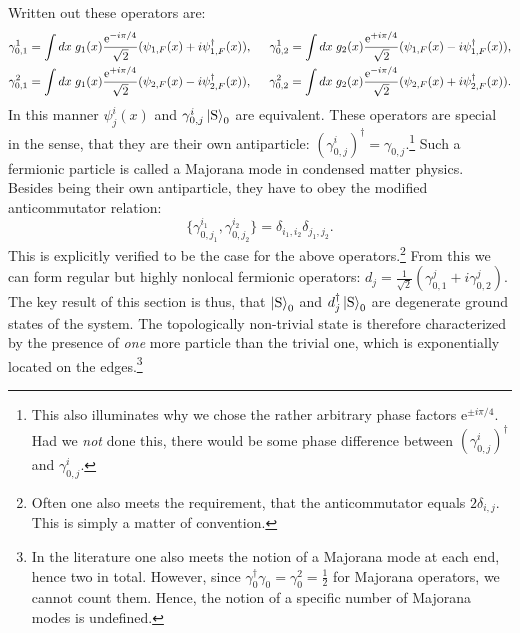 Written out these operators are: 
\begin{align}
\gamma^1_{0,1} &= \int dx \; g_1(x)\frac{\text{e}^{-i\pi/4}}{\sqrt{2}}(\psi_{1,F}(x) + i\psi^\dagger_{1,F}(x)), \hspace{0.5cm} \gamma^1_{0,2} = \int dx \; g_2(x)\frac{\text{e}^{+i\pi/4}}{\sqrt{2}}(\psi_{1,F}(x) - i\psi^\dagger_{1,F}(x)), \nonumber \\
\gamma^2_{0,1} &= \int dx \; g_1(x)\frac{\text{e}^{+i\pi/4}}{\sqrt{2}}(\psi_{2,F}(x) - i\psi^\dagger_{2,F}(x)), \hspace{0.5cm} \gamma^2_{0,2} = \int dx \; g_2(x)\frac{\text{e}^{-i\pi/4}}{\sqrt{2}}(\psi_{2,F}(x) + i \psi^\dagger_{2,F}(x)). \nonumber 
\end{align}
In this manner $\psi^{i}_{j}(x)$ and $\gamma^{i}_{0,j}\ket{\text{S}}_0$ are equivalent. These operators are special in the sense, that they are their own antiparticle: $\left(\gamma^{i}_{0,j}\right)^\dagger = \gamma_{0,j}$.\footnote{This also illuminates why we chose the rather arbitrary phase factors $\text{e}^{\pm i\pi/4}$. Had we \textit{not} done this, there would be some phase difference between $\left(\gamma^{i}_{0,j}\right)^\dagger$ and $\gamma^{i}_{0,j}$.} Such a fermionic particle is called a Majorana mode in condensed matter physics. Besides being their own antiparticle, they have to obey the modified anticommutator relation:
\begin{equation}
\{\gamma^{i_1}_{0,j_1}, \gamma^{i_2}_{0,j_2} \} = \delta_{i_1,i_2}\delta_{j_1,j_2}. \nonumber
\end{equation}
This is explicitly verified to be the case for the above operators.\footnote{Often one also meets the requirement, that the anticommutator equals $2\delta_{i,j}$. This is simply a matter of convention.} From this we can form regular but highly nonlocal fermionic operators: $d_j = \frac{1}{\sqrt{2}}(\gamma^{j}_{0,1} + i\gamma^{j}_{0,2})$. The key result of this section is thus, that $\ket{\text{S}}_0$ and $d_j^\dagger\ket{\text{S}}_0$ are degenerate ground states of the system. The topologically non-trivial state is therefore characterized by the presence of \textit{one} more particle than the trivial one, which is exponentially located on the edges.\footnote{In the literature one also meets the notion of a Majorana mode at each end, hence two in total. However, since $\gamma^\dagger_0\gamma_0 = \gamma_0^2 = \frac{1}{2}$ for Majorana operators, we cannot count them. Hence, the notion of a specific number of Majorana modes is undefined.}

